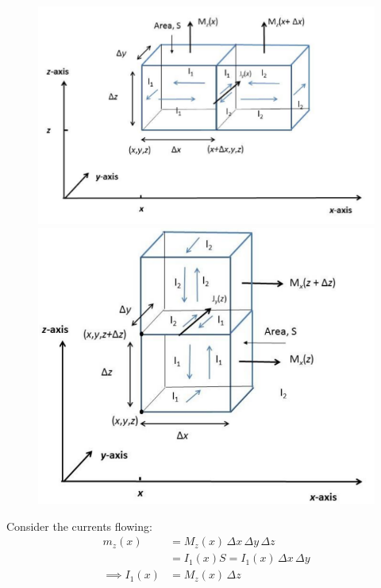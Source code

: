 \documentclass[a4paper, 11pt, normalem]{report}
\begin{document}
\begin{figure}[H]
	\centering
	\includegraphics[scale=0.4]{magbox1.png}
	\includegraphics[scale=0.3]{magbox2.png}
\end{figure}

Consider the currents flowing:
\begin{align*}
    m_z(x) &= M_z(x)\,\Delta x\,\Delta y\,\Delta z \\
    &= I_1(x)S = I_1(x)\,\Delta x\,\Delta y \\
    \implies I_1(x) &= M_z(x)\,\Delta z
\end{align*}
\end{document}

